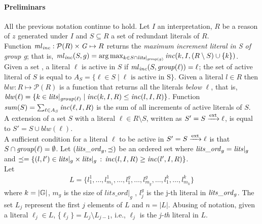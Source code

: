 \paragraph*{Preliminars} All the previous notation continue to hold.
Let $I$ an interpretation, $R$ be a reason of $z$ generated under $I$ 
and $S \subseteq R$ a set of redundant literals of $R$.\\
Function $\mathit{\mathit{ml}_{\mathit{inc}}} : \mathcal{P}(R) \times \mathit{G} \mapsto R$ 
returns the \textit{maximum increment literal in S of group g};
that is, 
$\mathit{ml}_{\mathit{inc}}(S,g)= \arg\max_{k \in S \cap \mathit{lits}|_{{\mathit{group}(g)}}} \mathit{inc}(k,I,(R \setminus S) \cup \{k\} )$.\\   
Given a set , a literal $\ell$ is active in $S$ if $\mathit{ml}_{\mathit{inc}}(S,\mathit{group}(\ell)) = \ell$;
the set of active literal of $S$ is equal to $A_S = \{\ell \in S \mid \ell \text{ is active in S}\}$.
Given a literal $l \in R$ then $blw: R \mapsto \mathcal{P}(R)$ is a function 
that returns all the literals \textit{below} $\ell$, 
that is, $\mathit{blw}(\ell) = \{ k \in \mathit{lits}|_{\mathit{group}(\ell)} \mid \mathit{inc}(k,I,R) \le \mathit{inc}(l,I,R) \}$.
Function $\mathit{sum}(S) = \sum_{\ell \in A_S} \mathit{inc}(\ell,I,R)$ is the sum of all increments  
of active literals of $S$.\\
A extension of a set $S$ with a literal $\ell \in R \setminus S$, written as $S' = S \xrightarrow{\text{ext}} \ell$,
is equal to $S' = S \cup blw(\ell)$.\\
A sufficient condition for a literal $\ell$ 
to be active in $S' = S \xrightarrow{\text{ext}} \ell$ is that 
$S \cap \mathit{group}(\ell) = \emptyset$.
Let $(\mathit{lits}\_\mathit{ord}_g, \preceq)$ be an ordered set where $\mathit{lits}\_\mathit{ord}_g = \mathit{lits}|_g$
and $\preceq = \{(l,l') \in \mathit{lits}|_g \times \mathit{lits}|_g \,:\, \mathit{inc}(l,I,R) \ge \mathit{inc}(l',I,R)\}$.\\
Let 
\begin{align}
    \label{eq:L}
    L = \{l^1_1,\hdots,l^1_{m_1},\hdots,l^g_1,\hdots,l^g_{m_g},\hdots,l^k_1,\hdots,l^k_{m_k} \}
\end{align}
where $k = |\mathbb{G}|$, $m_g$ is the size of $lits\_\mathit{ord}|_g$ , $l^g_j$ is the j-th literal in $\mathit{lits}\_\mathit{ord}_{g}$.
The set $L_j$ represent the first $j$ elements of $L$ and $n = |L|$.
Abusing of notation, given a literal $\ell_j \in L$, \{$\ell_j\} = L_j \setminus L_{j-1}$, i.e., $\ell_j$
is the \textit{j-th} literal in $L$.

